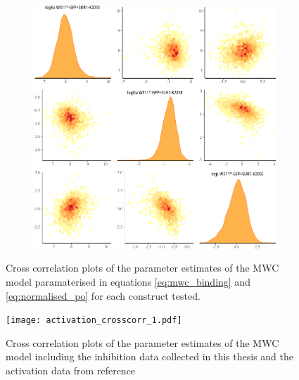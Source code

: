 \begin{figure}[h]
\begin{subfigure}[t]{0.3\textwidth}
	\end{subfigure}
	\hfill
	\begin{subfigure}[t]{0.3\textwidth}
		\caption{}\label{apxfig:inhib_cc_9}
		\centering
		\includegraphics[width=\textwidth]{inhibition_crosscorr_9.pdf}
	\end{subfigure}
	\caption[MWC parameter cross-correlation - inhibition]{
	Cross correlation plots of the parameter estimates of the MWC model paramaterised in equations \ref{eq:mwc_binding} and \ref{eq:normalised_po} for each construct tested.
	}
	\label{apxfig:inhibition_crosscorr}
\end{figure}

\begin{figure}[h]
	\centering
	\texttt{[image: activation\_crosscorr\_1.pdf]}
	\caption[MWC parameter cross-correlation - inhibition and activation]{
	Cross correlation plots of the parameter estimates of the MWC model including the inhibition data collected in this thesis and the activation data from reference \cite{puljung_activation_2019-1}
	}
	\label{apxfig:activation_crosscorr}
\end{figure}